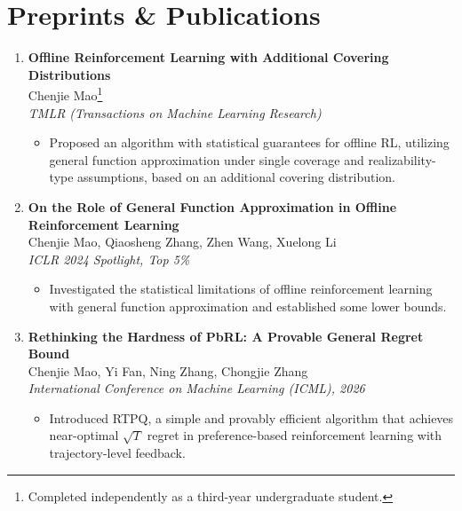 \documentclass[11pt,a4paper]{article}
\begin{document}
\section*{Preprints \& Publications}
\begin{enumerate}[leftmargin=*, noitemsep, topsep=2pt]

    \item \textbf{Offline Reinforcement Learning with Additional Covering Distributions} \\
    Chenjie Mao\footnote{Completed independently as a third-year undergraduate student.} \\
    \textit{TMLR (Transactions on Machine Learning Research)}
    \begin{itemize}[leftmargin=1.5em, noitemsep, topsep=1pt]
        \item Proposed an algorithm with statistical guarantees for offline RL, utilizing general function approximation under single coverage and realizability-type assumptions, based on an additional covering distribution.
    \end{itemize}
    
    \vspace{0.5em}
    
    \item \textbf{On the Role of General Function Approximation in Offline Reinforcement Learning} \\
    Chenjie Mao, Qiaosheng Zhang, Zhen Wang, Xuelong Li \\
    \textit{ICLR 2024 Spotlight, Top 5\%}
    \begin{itemize}[leftmargin=1.5em, noitemsep, topsep=1pt]
        \item Investigated the statistical limitations of offline reinforcement learning with general function approximation and established some lower bounds.
    \end{itemize}

    \item \textbf{Rethinking the Hardness of PbRL: A Provable General Regret Bound} \\
    Chenjie Mao, Yi Fan, Ning Zhang, Chongjie Zhang\\
    \textit{International Conference on Machine Learning (ICML), 2026}
    \begin{itemize}[leftmargin=1.5em, noitemsep, topsep=1pt]
        \item Introduced RTPQ, a simple and provably efficient algorithm that achieves near-optimal $\sqrt{T}$ regret in preference-based reinforcement learning with trajectory-level feedback.
    \end{itemize}
\end{enumerate}
\end{document}
